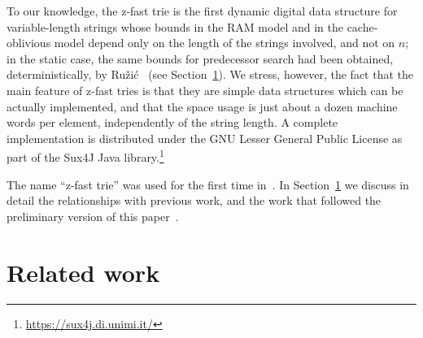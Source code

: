 \documentclass[a4paper]{article}
\newcommand{\?}{\mskip1.5mu}
\begin{document}
To our knowledge, the z-fast trie is the first dynamic digital data structure for
variable-length strings whose bounds in the RAM model and in the cache-oblivious model 
depend only on the length of the strings involved, and not on $n$; in the static case, the same bounds for
predecessor search had been obtained, deterministically, 
by Ru\v{z}i\'c~\cite{Ruzic2007Making,Ruzic2009Making} (see Section~\ref{sec:related}). 
We stress, however, the fact that
the main feature of z-fast tries is that they are simple data structures
which can be actually implemented, and that the space usage is just about a dozen
machine words per element, independently of the string length. A complete
implementation is distributed under the GNU Lesser General Public
License as part of the Sux4J Java library.\footnote{\url{https://sux4j.di.unimi.it/}}

The name ``z-fast trie'' was used for the first time in~\cite{BBPMMPH}. In Section~\ref{sec:related}
we discuss in detail the relationships with previous work, and the work that followed the preliminary 
version of this paper~\cite{BBVDZT}.

\section{Related work}
\label{sec:related}
\end{document}
